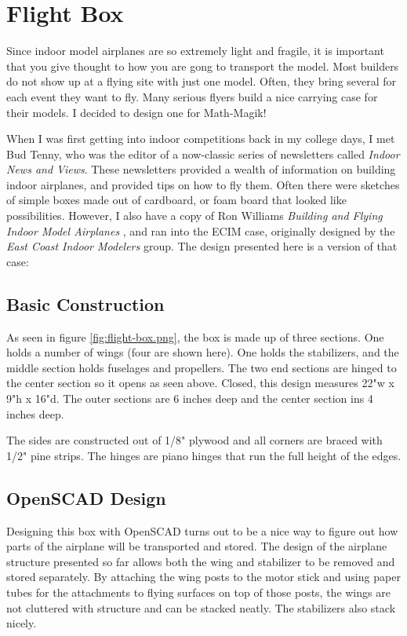 \section*{Flight Box}

Since indoor model airplanes are so extremely light and fragile, it is
important that you give thought to how you are gong to transport the model.
Most builders do not show up at a flying site with just one model. Often, they
bring several for each event they want to fly. Many serious flyers build a nice
carrying case for their models. I decided to design one for Math-Magik!

When I was first getting into indoor competitions back in my college days, I
met Bud Tenny, who was the editor of a now-classic series of newsletters called
{\it Indoor News and Views}. These newsletters provided a wealth of information on
building indoor airplanes, and provided tips on how to fly them. Often there
were sketches of simple boxes made out of cardboard, or foam board that looked
like possibilities. However, I also have a copy of Ron Williams {\it Building and
Flying Indoor Model Airplanes} \cite{williams} , and ran into the ECIM
case, originally designed by the {\it East Coast Indoor Modelers} group. The design
presented here is a version of that case:



\subsection{Basic Construction}

As seen in figure \ref{fig:flight-box.png}, the box is made up of three
sections. One holds a number of wings (four are shown here). One holds the
stabilizers, and the middle section holds fuselages and propellers. The two end
sections are hinged to the center section so it opens as seen above. Closed,
this design measures 22"w x 9"h x 16"d. The outer sections are 6 inches deep
and the center section ins 4 inches deep.

The sides are constructed out of 1/8" plywood and all corners are braced with
1/2" pine strips. The hinges are piano hinges that run the full height of the
edges.

\subsection{OpenSCAD Design}

Designing this box with OpenSCAD turns out to be a nice way to figure out how
parts of the airplane will be transported and stored. The design of the
airplane structure presented so far allows both the wing and stabilizer to be
removed and stored separately. By attaching the wing posts to the motor stick and
using paper tubes for the attachments to flying surfaces on top of those posts,
the wings are not cluttered with structure and can be stacked neatly. The
stabilizers also stack nicely.

